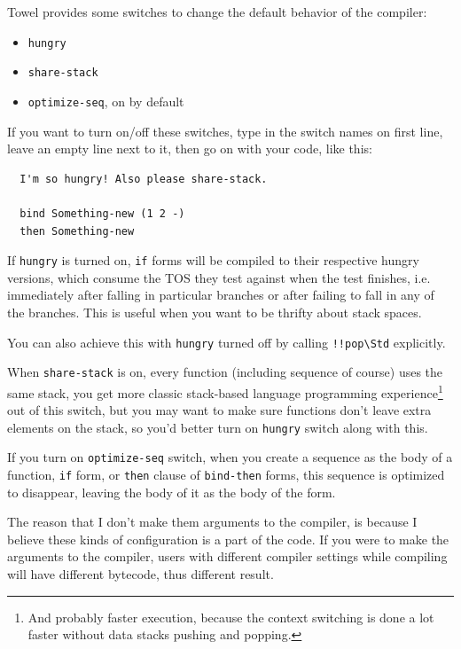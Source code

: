 \documentclass{report}
\newcommand{\mstd}[1]{\texttt{#1\textbackslash Std}}
\begin{document}
Towel provides some switches to change the default behavior of the compiler:
\begin{itemize}
\item \texttt{hungry}
\item \texttt{share-stack}
\item \texttt{optimize-seq}, on by default
\end{itemize}

If you want to turn on/off these switches, type in the switch names on first line, leave an empty line next to it, then go on with your code, like this:
\begin{mdframed}[style=example]
\begin{verbatim}
  I'm so hungry! Also please share-stack.

  bind Something-new (1 2 -)
  then Something-new
\end{verbatim}
\end{mdframed}

If \texttt{hungry} is turned on, \texttt{if} forms will be compiled to their respective hungry versions, which consume the TOS they test against when the test finishes, i.e. immediately after falling in particular branches or after failing to fall in any of the branches. This is useful when you want to be thrifty about stack spaces.

\begin{mdframed}[style=hint]
  You can also achieve this with \texttt{hungry} turned off by calling \mstd{!!pop} explicitly.
\end{mdframed}

When \texttt{share-stack} is on, every function (including sequence of course) uses the same stack, you get more classic stack-based language programming experience\footnote{And probably faster execution, because the context switching is done a lot faster without data stacks pushing and popping.} out of this switch, but you may want to make sure functions don't leave extra elements on the stack, so you'd better turn on \texttt{hungry} switch along with this.

If you turn on \texttt{optimize-seq} switch, when you create a sequence as the body of a function, \texttt{if} form, or \texttt{then} clause of \texttt{bind-then} forms, this sequence is optimized to disappear, leaving the body of it as the body of the form.

\begin{mdframed}[style=detail]
  The reason that I don't make them arguments to the compiler, is because I believe these kinds of configuration is a part of the code. If you were to make the arguments to the compiler, users with different compiler settings while compiling will have different bytecode, thus different result.
\end{mdframed}
\end{document}
